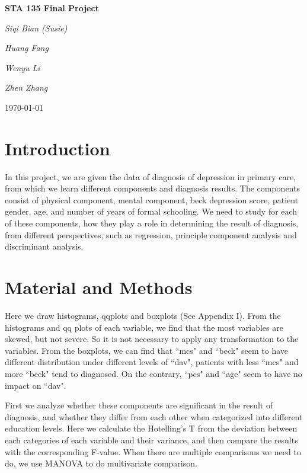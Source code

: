 \documentclass{article}
\begin{document}
  \begin{titlepage}
  	\centering
  	{\huge\bfseries STA 135 Final Project\par}
  	\vspace{2cm}
  	{\Large\itshape Siqi Bian (Susie)\par}
    \vspace{0.5cm}
  	{\Large\itshape Huang Fang\par}
    \vspace{0.5cm}
  	{\Large\itshape Wenyu Li\par}
  	\vspace{0.5cm}
  	{\Large\itshape Zhen Zhang\par}
  	\vfill

  	\vfill
  	{\large \today\par}
  \end{titlepage}

  \newpage

  \section{Introduction}

    In this project, we are given the data of diagnosis of depression in primary care, from which we learn different components and diagnosis results. The components consist of physical component, mental component, beck depression score, patient gender, age, and number of years of formal schooling. We need to study for each of these components, how they play a role in determining the result of diagnosis, from different perspectives, such as regression, principle component analysis and discriminant analysis.
  \section{Material and Methods}
    Here we draw histograms, qqplots and boxplots (See Appendix I). From the histograms and qq plots of each variable, we find that the most variables are skewed, but not severe. So it is not necessary to apply any transformation to the variables. From the boxplots, we can find that ``mcs" and ``beck" seem to have different distribution under different levels of ``dav", patients with less ``mcs" and more ``beck" tend to diagnosed. On the contrary, ``pcs" and ``age" seem to have no impact on ``dav".

    First we analyze whether these components are significant in the result of diagnosis, and whether they differ from each other when categorized into different education levels. Here we calculate the Hotelling's T from the deviation between each categories of each variable and their variance, and then compare the results with the corresponding F-value. When there are multiple comparisons we need to do, we use MANOVA to do multivariate comparison.
\end{document}
